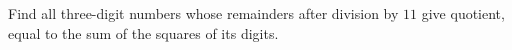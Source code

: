Find all three-digit numbers whose remainders after division by $11$ give quotient, equal to the sum of the squares of its digits.